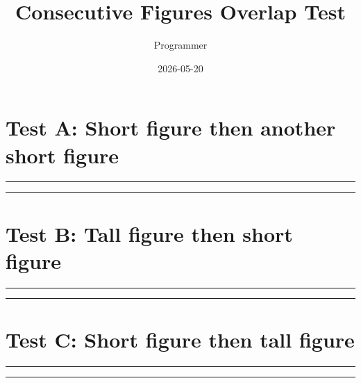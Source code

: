 \documentclass[a4paper,11pt]{article}
\title{Consecutive Figures Overlap Test}
\author{Programmer}
\date{2026-05-20}
\begin{document}
\maketitle

\section*{Test A: Short figure then another short figure}
\begin{swarmwrap}%
  \begin{minipage}[t]{2cm}
    \centering
    \rule{\linewidth}{2cm}
  \end{minipage}%
\end{swarmwrap}%
\swarmwrapnext
\lipsum[1]
\begin{swarmwrap}%
  \begin{minipage}[t]{3cm}
    \centering
    \rule{\linewidth}{3cm}
  \end{minipage}%
\end{swarmwrap}%
\swarmwrapnext
\lipsum[2]
\lipsum[3]

\section*{Test B: Tall figure then short figure}
\begin{swarmwrap}%
  \begin{minipage}[t]{3cm}
    \centering
    \rule{\linewidth}{8cm}
  \end{minipage}%
\end{swarmwrap}%
\swarmwrapnext
\lipsum[4]
\lipsum[5]
\begin{swarmwrap}%
  \begin{minipage}[t]{2cm}
    \centering
    \rule{\linewidth}{2cm}
  \end{minipage}%
\end{swarmwrap}%
\swarmwrapnext
\lipsum[6]

\section*{Test C: Short figure then tall figure}
\begin{swarmwrap}%
  \begin{minipage}[t]{2cm}
    \centering
    \rule{\linewidth}{2cm}
  \end{minipage}%
\end{swarmwrap}%
\swarmwrapnext
\lipsum[7]
\begin{swarmwrap}%
  \begin{minipage}[t]{4cm}
    \centering
    \rule{\linewidth}{10cm}
  \end{minipage}%
\end{swarmwrap}%
\swarmwrapnext
\lipsum[8]
\lipsum[9]
\end{document}
